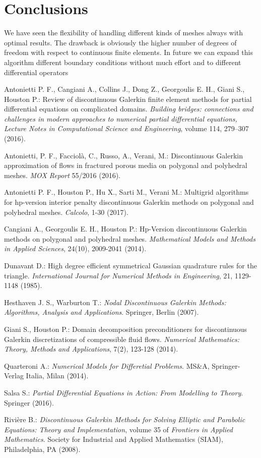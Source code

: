 \documentclass[12pt, a4paper]{article}
\theoremstyle{definition}
\theoremstyle{plain}
\theoremstyle{plain}
\begin{document}
\section{Conclusions}\label{sec:conc}
We have seen the flexibility of handling different kinds of meshes always with 
optimal results. The drawback is obviously the higher number of degrees of 
freedom with respect to continuous finite elements. In future we can expand 
this algorithm different boundary conditions without much effort and to 
different differential operators 
\begin{thebibliography}{99}
	Antonietti P. F., Cangiani  A., Collins J., Dong Z., Georgoulis E. H., Giani S., Houston P.: Review of discontinuous Galerkin finite element methods for partial differential equations on complicated domains. \emph{Building bridges: connections and challenges in modern approaches to numerical partial differential equations, Lecture Notes in Computational Science and Engineering}, volume 114, 279–307 (2016).
	
	Antonietti, P. F., Facciolà, C., Russo, A., Verani, M.: Discontinuous Galerkin approximation of flows in fractured porous media on polygonal and polyhedral meshes. \emph{MOX Report} 55/2016 (2016).
	
	Antonietti P. F., Houston  P., Hu  X., Sarti  M., Verani M.: Multigrid algorithms for hp-version interior penalty discontinuous Galerkin methods on polygonal and	polyhedral meshes. \emph{Calcolo}, 1-30 (2017).
	
	Cangiani A., Georgoulis E. H., Houston P.: Hp-Version discontinuous Galerkin methods on polygonal and polyhedral meshes. \emph{Mathematical Models and Methods in Applied Sciences}, 24(10), 2009-2041 (2014).
	
	Dunavant D.: High degree efficient symmetrical Gaussian quadrature rules for the triangle. \emph{International Journal for Numerical Methods in Engineering}, 21, 1129-1148 (1985).
	
	Hesthaven J. S., Warburton T.: \emph{Nodal Discontinuous Galerkin Methods: Algorithms, Analysis and Applications}. Springer, Berlin (2007).
	
	Giani S., Houston P.: Domain decomposition preconditioners for discontinuous Galerkin discretizations of compressible fluid flows. \emph{Numerical Mathematics: Theory, Methods and Applications}, 7(2), 123-128 (2014).
	
	Quarteroni A.: \emph{Numerical Models for Differetial Problems}. MS\&A, Springer-Verlag Italia, Milan (2014).
	
	Salsa S.: \emph{Partial Differential Equations in Action: From Modelling to Theory}. Springer (2016).
	
	Rivière B.: \emph{Discontinuous Galerkin Methods for Solving Elliptic and Parabolic Equations: Theory and Implementation}, volume 35 of \emph{Frontiers in Applied Mathematics}. Society for Industrial and Applied Mathematics (SIAM), Philadelphia, PA (2008).
\end{thebibliography}
\end{document}
